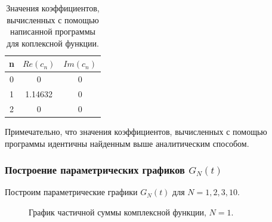 \documentclass[a5paper, 10pt]{article}
\theoremstyle{definition}
\theoremstyle{plain}
\theoremstyle{remark}
\begin{document}
\begin{table}[h]
\caption{Значения коэффициентов, вычисленных с помощью написанной программы для коплексной функции.}
\label{tabular:timesandtenses}
\begin{center}
\begin{tabular}{|c|c|c|}
\hline
n &  $Re(c_n)$ & $Im(c_n)$ \\
\hline
0 & 0 & 0\\
\hline
1  & 1.14632 & 0\\
\hline
2  & 0  & 0\\
\hline
\end{tabular}
\end{center}
\end{table}
\newpage
Примечательно, что значения коэффициентов, вычисленных с помощью программы идентичны найденным выше аналитическим способом.

\subsubsection{Построение параметрических графиков $G_N(t)$}
Построим параметрические графики $G_N(t)$ для $N = 1, 2, 3, 10$.

\begin{figure}[h]
\caption{График частичной суммы комплексной функции, $N=1$.}
\end{figure}
\end{document}
